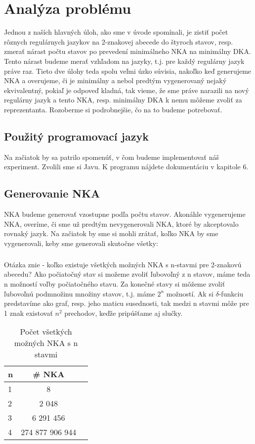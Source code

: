 \chapter{Analýza problému}
Jednou z naších hlavných úloh, ako sme v úvode spomínali, je zistiť počet rôznych regulárnych jazykov na 2-znakovej abecede do štyroch stavov, resp. zmerať nárast počtu stavov po prevedení minimálneho NKA na minimálny DKA. Tento nárast budeme merať vzhľadom na jazyky, t.j. pre každý regulárny jazyk práve raz. Tieto dve úlohy teda spolu veľmi úzko súvisia, nakoľko keď generujeme NKA a overujeme, či je minimálny a nebol predtým vygenerovaný nejaký ekvivalentný, pokiaľ je odpoveď kladná, tak vieme, že sme práve narazili na nový regulárny jazyk a tento NKA, resp. minimálny DKA k nemu môžeme zvoliť za reprezentanta. Rozoberme si podrobnejšie, čo na to budeme potrebovať.


\section{Použitý programovací jazyk}
Na začiatok by sa patrilo spomenúť, v čom budeme implementovať náš experiment. Zvolili sme si Javu. K programu nájdete dokumentáciu v kapitole 6.

\label{genNKA}
\section{Generovanie NKA}
NKA budeme generovať vzostupne podľa počtu stavov. Akonáhle vygenerujeme NKA, overíme, či sme už predtým nevygenerovali NKA, ktoré by akceptovalo rovnaký jazyk. Na začiatok by sme si mohli zrátať, koľko NKA by sme vygenerovali, keby sme generovali skutočne všetky:

\paragraph{}
Otázka znie - koľko existuje všetkých možných NKA s n-stavmi pre 2-znakovú abecedu? Ako počiatočný stav si možeme zvoliť ľubovoľný z n stavov, máme teda n možností voľby počiatočného stavu. Za konečné stavy si môžeme zvoliť ľubovoľnú podmnožinu množiny stavov, t.j. máme $2^n$ možností. Ak si $\delta$-funkciu predstavíme ako graf, resp. jeho maticu susednosti, tak medzi n stavmi môže pre 1 znak existovať $n^2$ prechodov, keďže pripúšťame aj slučky.


\begin{table}[h]
  \centering
  \begin{tabular}{|l|c|r|}
    \hline
    n & \# NKA \\
    \hline
    1 & 8 \\ 
    \hline
    2 & 2 048 \\ 
    \hline
    3 & 6 291 456 \\
    \hline
    4 & 274 877 906 944 \\
    \hline
  \end{tabular}
  \caption{Počet všetkých možných NKA s n stavmi}
  \label{tab:pocVsNKA}
\end{table}
